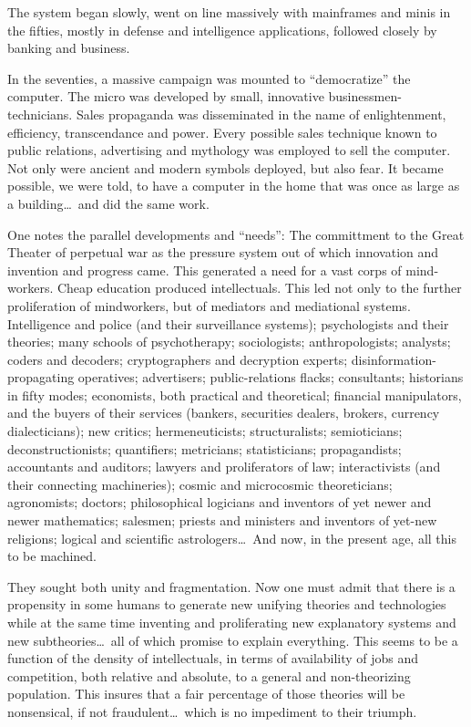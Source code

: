 The system began slowly, went on line massively with mainframes and minis in the fifties, mostly in
defense and intelligence applications, followed closely by banking and business. 

In the seventies, a massive campaign was mounted to \enquote{democratize} the computer. The micro
was developed by small, innovative businessmen-technicians. Sales propaganda was disseminated in the
name of enlightenment, efficiency, transcendance and power. Every possible sales technique known to
public relations, advertising and mythology was employed to sell the computer. Not only were ancient
and modern symbols deployed, but also fear. It became possible, we were told, to have a computer in
the home that was once as large as a building\ldots\ and did the same work. 

One notes the parallel developments and \enquote{needs}: The committment to the Great Theater of
perpetual war as the pressure system out of which innovation and invention and progress came. This
generated a need for a vast corps of mind-workers. Cheap education produced intellectuals. This led
not only to the further proliferation of mindworkers, but of mediators and mediational systems.
Intelligence and police (and their surveillance systems); psychologists and their theories; many
schools of psychotherapy; sociologists; anthropologists; analysts; coders and decoders;
cryptographers and decryption experts; disinformation-propagating operatives; advertisers;
public-relations flacks; consultants; historians in fifty modes; economists, both practical and
theoretical; financial manipulators, and the buyers of their services (bankers, securities dealers,
brokers, currency dialecticians); new critics; hermeneuticists; structuralists; semioticians;
deconstructionists; quantifiers; metricians; statisticians; propagandists; accountants and auditors;
lawyers and proliferators of law; interactivists (and their connecting machineries); cosmic and
microcosmic theoreticians; agronomists; doctors; philosophical logicians and inventors of yet newer
and newer mathematics; salesmen; priests and ministers and inventors of yet-new religions; logical
and scientific astrologers\ldots\ And now, in the present age, all this to be machined. 

They sought both unity and fragmentation. Now one must admit that there is a propensity in some
humans to generate new unifying theories and technologies while at the same time inventing and
proliferating new explanatory systems and new subtheories\ldots\ all of which promise to explain
everything. This seems to be a function of the density of intellectuals, in terms of availability of
jobs and competition, both relative and absolute, to a general and non-theorizing population. This
insures that a fair percentage of those theories will be nonsensical, if not fraudulent\ldots\ which is
no impediment to their triumph. 

